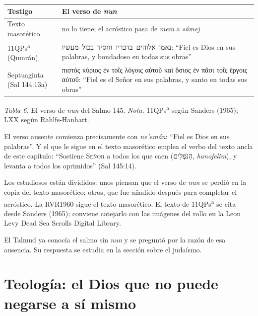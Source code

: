 \documentclass[11pt,letterpaper]{article}
\newcommand{\heb}[1]{\mbox{\foreignlanguage{hebrew}{#1}}}
\newcommand{\grc}[1]{\foreignlanguage{ancientgreek}{#1}}
\newcommand{\SENOR}{\textsc{Señor}}
\begin{document}
\begin{center}\small\renewcommand{\arraystretch}{1.25}
\begin{tabular}{@{}L{3.6cm}L{10.8cm}@{}}
\toprule
\textbf{Testigo} & \textbf{El verso de \emph{nun}} \\ \midrule
Texto masorético & no lo tiene; el acróstico pasa de \emph{mem} a \emph{sámej} \\
11QPs\textsuperscript{a} (Qumrán) & \heb{נאמן אלוהים בדבריו וחסיד בכול מעשיו}: ``Fiel es Dios en sus palabras, y bondadoso en todas sus obras'' \\
Septuaginta (Sal 144:13a) & \grc{πιστὸς κύριος ἐν τοῖς λόγοις αὐτοῦ καὶ ὅσιος ἐν πᾶσι τοῖς ἔργοις αὐτοῦ}: ``Fiel es el Señor en sus palabras, y santo en todas sus obras'' \\
\bottomrule
\end{tabular}\par
{\footnotesize\color{gris}\textit{Tabla 6.} El verso de \emph{nun} del Salmo 145. \textit{Nota.} 11QPs\textsuperscript{a} según Sanders (1965); LXX según Rahlfs-Hanhart.}
\end{center}

El verso ausente comienza precisamente con \emph{ne'emán}: ``Fiel es Dios en sus palabras''. Y el que le sigue en el texto masorético emplea el verbo del texto ancla de este capítulo: ``Sostiene \SENOR{} a todos los que caen (\heb{הַנֹּפְלִים}, \emph{hanofelim}), y levanta a todos los oprimidos'' (Sal 145:14).

\begin{nota}
Los estudiosos están divididos: unos piensan que el verso de \emph{nun} se perdió en la copia del texto masorético; otros, que fue añadido después para completar el acróstico. La RVR1960 sigue el texto masorético. El texto de 11QPs\textsuperscript{a} se cita desde Sanders (1965); conviene cotejarlo con las imágenes del rollo en la Leon Levy Dead Sea Scrolls Digital Library.
\end{nota}

El Talmud ya conocía el salmo sin \emph{nun} y se preguntó por la razón de esa ausencia. Su respuesta se estudia en la sección sobre el judaísmo.

\section{Teología: el Dios que no puede negarse a sí mismo}
\end{document}
